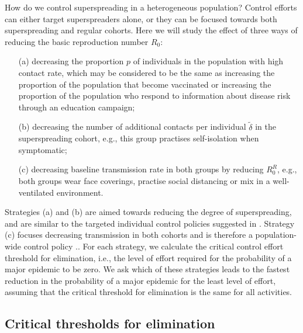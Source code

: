 \documentclass{imammb}
\numberwithin{equation}{section}
\begin{document}
How do we control superspreading in a heterogeneous population? Control efforts can either target superspreaders alone, or they can be focused towards both superspreading and regular cohorts. Here we will study the effect of three ways of reducing the basic reproduction number $R_0$:
\begin{itemize}
\item[(a)] decreasing the proportion $p$ of individuals in the population with high contact rate, which may
be considered to be the same as increasing the proportion of the population that become vaccinated or increasing the proportion of the population who respond to information about disease risk through an education campaign; %
\item [(b)] decreasing the number of additional contacts per individual $\tilde{\delta}$ in the superspreading cohort, e.g., this group practises self-isolation when symptomatic;
\item [(c)] decreasing baseline transmission rate in both groups by reducing $R_0^R$, e.g., both groups wear face coverings, practise social distancing or mix in a well-ventilated environment. 
\end{itemize}
Strategies (a) and (b) are aimed towards reducing the degree of superspreading, and are similar to the targeted individual control policies suggested in \citet{Lloyd-Smith2005-ma}. Strategy (c) focuses decreasing transmission in both cohorts and is therefore a population-wide control policy \citep{Lloyd-Smith2005-ma}.. For each strategy, we calculate the critical control effort threshold for elimination, i.e., the level of effort required for the probability of a major epidemic to be zero. We ask which of these strategies leads to the fastest reduction in the probability of a major epidemic for the least level of effort, assuming that the critical threshold for elimination is the same for all activities. 

\subsection{Critical thresholds for elimination}
\end{document}
